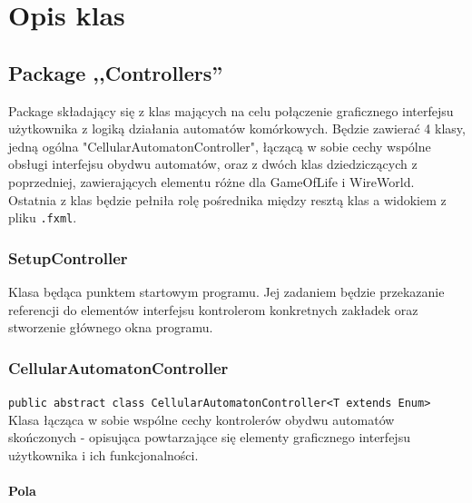 \documentclass{report}
\begin{document}
\chapter{Opis klas}

\section{Package ,,Controllers''}
Package składający się z klas mających na celu połączenie graficznego interfejsu użytkownika z logiką działania automatów komórkowych. Będzie zawierać 4 klasy, jedną ogólna "CellularAutomatonController", łączącą w sobie cechy wspólne obsługi interfejsu obydwu automatów, oraz z dwóch klas dziedziczących z poprzedniej, zawierających elementu różne dla GameOfLife i WireWorld. Ostatnia z klas będzie pełniła rolę pośrednika między resztą klas a widokiem z pliku \texttt{.fxml}.

\subsection{SetupController}
Klasa będąca punktem startowym programu. Jej zadaniem będzie przekazanie referencji do elementów interfejsu kontrolerom konkretnych zakładek oraz stworzenie głównego okna programu.

\subsection{CellularAutomatonController}
\texttt{public abstract class CellularAutomatonController<T extends Enum>}
Klasa łącząca w sobie wspólne cechy kontrolerów obydwu automatów skończonych - opisująca powtarzające się elementy graficznego interfejsu użytkownika i ich funkcjonalności.
\subsubsection{Pola}
\end{document}
